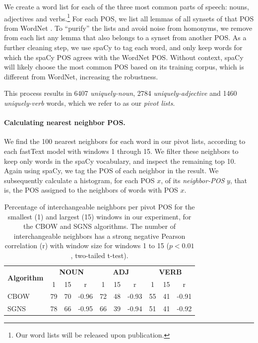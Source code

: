 \documentclass[11pt,a4paper]{article}
\begin{document}
    We create a word list for each of the three most
    common parts of speech:
    nouns, adjectives and verbs.\footnote{Our word lists will be released upon publication.}
    For each POS, we list all lemmas of all synsets of that POS from
    WordNet \cite{miller1998wordnet}.
    To ``purify'' the lists and avoid noise from homonyms,
    we remove from each list any lemma that also belongs to a synset from
    another POS.
    As a further cleaning step, we use spaCy to tag each word,
    and only keep words for which the spaCy POS agrees with the WordNet POS.
    Without context, spaCy will likely choose the most
    common POS based on its training corpus, which is different from WordNet,
    increasing the robustness.
    
    This process results in 6407 \textit{uniquely-noun}, 2784 \textit{uniquely-adjective}
    and 1460 \textit{uniquely-verb} words, which we refer to as our \textit{pivot lists}.
    
    \paragraph{Calculating nearest neighbor POS.}
    
    We find the 100 nearest neighbors for each word in our pivot lists,
    according to each fastText model with windows 1 through 15.
    We filter these neighbors to
    keep only words in the spaCy vocabulary, and inspect the remaining top 10.
    Again using spaCy, we tag the POS of each neighbor in the result.
    We subsequently calculate a histogram, for each POS $x$, of its
    \textit{neighbor-POS} $y$, that is, the POS assigned to the neighbors of
    words with POS $x$.
    
    \begin{table}[t]
    \centering
    \small
    \setlength\tabcolsep{3.5pt}
    \def\arraystretch{1.125}
    \begin{tabular}{l|ccc|ccc|ccc}
    \multirow{2}{1cm}{\normalsize \bf Algorithm}
    & \multicolumn{3}{c|}{\normalsize \bf NOUN} & \multicolumn{3}{c|}{\normalsize \bf ADJ} & \multicolumn{3}{c}{\normalsize \bf VERB} \\
    & \normalsize 1 & \normalsize 15 & \normalsize r & \normalsize 1 & \normalsize 15 & \normalsize r & \normalsize 1 & \normalsize 15 & \normalsize r \\
    \hline
    \normalsize CBOW & 79 & 70 & -0.96 & 72 & 48 & -0.93 & 55 & 41 & -0.91 \\
    \normalsize SGNS & 78 & 66 & -0.95 & 66 & 39 & -0.94 & 51 & 41 & -0.92 
    \end{tabular}
    \caption{Percentage of interchangeable neighbors per pivot POS for the smallest (1) and largest (15)
        windows in our experiment, for the CBOW and SGNS algorithms.
        The number of interchangeable neighbors has a strong negative Pearson correlation (r) with window size
        for windows 1 to 15 ($p<0.01$, two-tailed t-test).
    \label{tab:nn_pos_hist}}
    \end{table}
    
\end{document}
